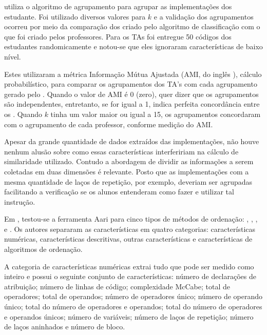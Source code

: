 	     utiliza o algoritmo de agrupamento 
	    para agrupar as implementações dos estudante. Foi utilizado diversos valores para $k$
	    e a validação dos agrupamentos ocorreu por meio da comparação dos 
	    criado pelo algoritmo de classificação com o que foi criado pelos professores.
	    Para os TAs foi entregue 50 códigos  dos estudantes randomicamente e notou-se
	    que eles ignoraram características de baixo nível.
	    
	    Estes utilizaram a métrica Informação Mútua Ajustada (AMI, do inglês
	    ), cálculo probabilístico, para comparar
	    os agrupamentos dos TA's com cada agrupamento gerado pelo .
	    Quando o valor de AMI é 0 (zero), quer dizer que os agrupamentos são
	    independentes, entretanto, se for igual a 1, indica perfeita concordância
	    entre os . Quando $k$ tinha um valor maior ou igual a 15,
	    os agrupamentos concordaram com o agrupamento de cada professor, conforme
	    medição do AMI.
	    
	    Apesar da grande quantidade de dados extraídos das implementações, não houve
	    nenhum alusão sobre como essas características interfeririam na cálculo de
	    similaridade utilizado. Contudo a abordagem de dividir as informações a serem
	    coletadas em duas dimensões é relevante. Posto que as implementações com
	    a mesma quantidade de laços de repetição, por exemplo, deveriam ser agrupadas
	    facilitando a verificação se os alunos entenderam como fazer e utilizar
	    tal instrução.
	    
	    Em , testou-se a ferramenta Aari para cinco tipos
	    de métodos de ordenação: , ,
	    ,  e . Os autores
		separaram as características em quatro categorias: características numéricas,
		características descritivas, outras características e características de
		algoritmos de ordenação.
	    
	    A categoria de características numéricas extrai tudo que pode ser medido
	    como inteiro e possui o seguinte conjunto de características: número de
	    declarações de atribuição; número de linhas de código; complexidade McCabe;
		total de operadores; total de operandos; número de operadores único; número
		de operando único; total do número de operadores e operandos; total do número
		de operadores e operandos únicos; número de variáveis; número de laços de
	    repetição; número de laços aninhados e número de bloco.
	    
